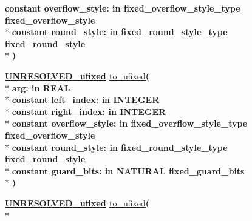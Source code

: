 \begin{DoxyCompactItemize}
{\bfseries {\bfseries \textcolor{keywordflow}{constant}\textcolor{vhdlchar}{ }}\textcolor{vhdlchar}{overflow\+\_\+style\+: }\textcolor{stringliteral}{in }\textcolor{vhdlchar}{fixed\+\_\+overflow\+\_\+style\+\_\+type     fixed\+\_\+overflow\+\_\+style}}\\*
{\bfseries {\bfseries \textcolor{keywordflow}{constant}\textcolor{vhdlchar}{ }}\textcolor{vhdlchar}{round\+\_\+style\+: }\textcolor{stringliteral}{in }\textcolor{vhdlchar}{fixed\+\_\+round\+\_\+style\+\_\+type     fixed\+\_\+round\+\_\+style}}\\*
{\bfseries  )} 
\item 
{\bfseries {\bfseries {\bfseries \hyperlink{classfixed__pkg_ae78bc2b36d22f6abeac163955e8a587d}{U\+N\+R\+E\+S\+O\+L\+V\+E\+D\+\_\+ufixed}} \textcolor{vhdlchar}{ }}} \hyperlink{classfixed__pkg_add558c42f9de17fdcbe3150c6f82ab99}{to\+\_\+ufixed}{\bfseries  ( }\\*
{\bfseries \textcolor{vhdlchar}{arg\+: }\textcolor{stringliteral}{in }{\bfseries \textcolor{comment}{R\+E\+A\+L}\textcolor{vhdlchar}{ }}}\\*
{\bfseries {\bfseries \textcolor{keywordflow}{constant}\textcolor{vhdlchar}{ }}\textcolor{vhdlchar}{left\+\_\+index\+: }\textcolor{stringliteral}{in }{\bfseries \textcolor{comment}{I\+N\+T\+E\+G\+E\+R}\textcolor{vhdlchar}{ }}}\\*
{\bfseries {\bfseries \textcolor{keywordflow}{constant}\textcolor{vhdlchar}{ }}\textcolor{vhdlchar}{right\+\_\+index\+: }\textcolor{stringliteral}{in }{\bfseries \textcolor{comment}{I\+N\+T\+E\+G\+E\+R}\textcolor{vhdlchar}{ }}}\\*
{\bfseries {\bfseries \textcolor{keywordflow}{constant}\textcolor{vhdlchar}{ }}\textcolor{vhdlchar}{overflow\+\_\+style\+: }\textcolor{stringliteral}{in }\textcolor{vhdlchar}{fixed\+\_\+overflow\+\_\+style\+\_\+type     fixed\+\_\+overflow\+\_\+style}}\\*
{\bfseries {\bfseries \textcolor{keywordflow}{constant}\textcolor{vhdlchar}{ }}\textcolor{vhdlchar}{round\+\_\+style\+: }\textcolor{stringliteral}{in }\textcolor{vhdlchar}{fixed\+\_\+round\+\_\+style\+\_\+type     fixed\+\_\+round\+\_\+style}}\\*
{\bfseries {\bfseries \textcolor{keywordflow}{constant}\textcolor{vhdlchar}{ }}\textcolor{vhdlchar}{guard\+\_\+bits\+: }\textcolor{stringliteral}{in }\textcolor{vhdlchar}{N\+A\+T\+U\+R\+A\+L     fixed\+\_\+guard\+\_\+bits}}\\*
{\bfseries  )} 
\item 
{\bfseries {\bfseries {\bfseries \hyperlink{classfixed__pkg_ae78bc2b36d22f6abeac163955e8a587d}{U\+N\+R\+E\+S\+O\+L\+V\+E\+D\+\_\+ufixed}} \textcolor{vhdlchar}{ }}} \hyperlink{classfixed__pkg_a450c24c2f73938e897e818ad413d78bf}{to\+\_\+ufixed}{\bfseries  ( }\\*

\end{DoxyCompactItemize}
